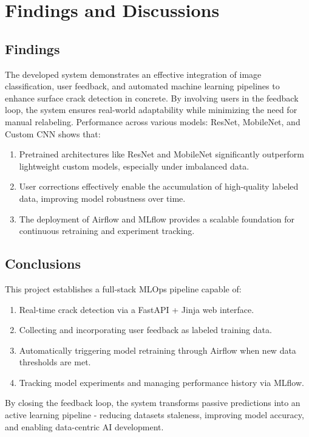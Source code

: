 \chapter{Findings and Discussions}

\section{Findings}

The developed system demonstrates an effective integration of image classification, user feedback, and automated machine learning pipelines to enhance surface crack detection in concrete. By involving users in the feedback loop, the system ensures real-world adaptability while minimizing the need for manual relabeling. Performance across various models: ResNet, MobileNet, and Custom CNN shows that:

\begin{enumerate}
	\item Pretrained architectures like ResNet and MobileNet significantly outperform lightweight custom models, especially under imbalanced data.
	\item User corrections effectively enable the accumulation of high-quality labeled data, improving model robustness over time.
	\item The deployment of Airflow and MLflow provides a scalable foundation for continuous retraining and experiment tracking.
\end{enumerate}

\section{Conclusions}

This project establishes a full-stack MLOps pipeline capable of:

\begin{enumerate}
	\item Real-time crack detection via a FastAPI + Jinja web interface.
	\item Collecting and incorporating user feedback as labeled training data.
	\item Automatically triggering model retraining through Airflow when new data thresholds are met.
	\item Tracking model experiments and managing performance history via MLflow.
\end{enumerate}

By closing the feedback loop, the system transforms passive predictions into an active learning pipeline - reducing datasets staleness, improving model accuracy, and enabling data-centric AI development.

